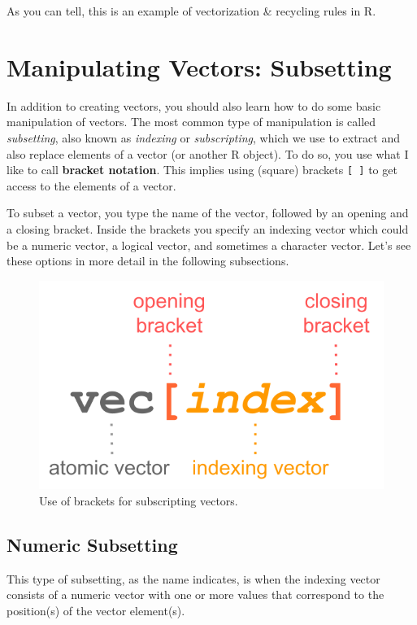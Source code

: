 \documentclass[
]{book}
\begin{document}
As you can tell, this is an example of vectorization \& recycling rules in R.

\hypertarget{manipulating-vectors-subsetting}{%
\section{Manipulating Vectors: Subsetting}\label{manipulating-vectors-subsetting}}

In addition to creating vectors, you should also learn how to do some basic
manipulation of vectors. The most common type of manipulation is called
\emph{subsetting}, also known as \emph{indexing} or \emph{subscripting}, which we use to
extract and also replace elements of a vector (or another R object). To do so,
you use what I like to call \textbf{bracket notation}. This implies using (square)
brackets \texttt{{[}\ {]}} to get access to the elements of a vector.

To subset a vector, you type the name of the vector, followed by an opening
and a closing bracket. Inside the brackets you specify an indexing vector
which could be a numeric vector, a logical vector, and sometimes a character
vector. Let's see these options in more detail in the following subsections.

\begin{figure}

{\centering \includegraphics[width=0.45\linewidth]{images/vectors/obj-vector-brackets1} 

}

\caption{Use of brackets for subscripting vectors.}\label{fig:unnamed-chunk-79}
\end{figure}

\hypertarget{numeric-subsetting}{%
\subsection{Numeric Subsetting}\label{numeric-subsetting}}

This type of subsetting, as the name indicates, is when the indexing vector
consists of a numeric vector with one or more values that correspond to the
position(s) of the vector element(s).
\end{document}
